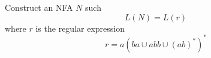 Construct an NFA $N$ such 
\[
L(N) = L(r)
\]
where $r$ is the regular expression
\[
r = a (ba \cup abb \cup (ab)^*)^*
\]

